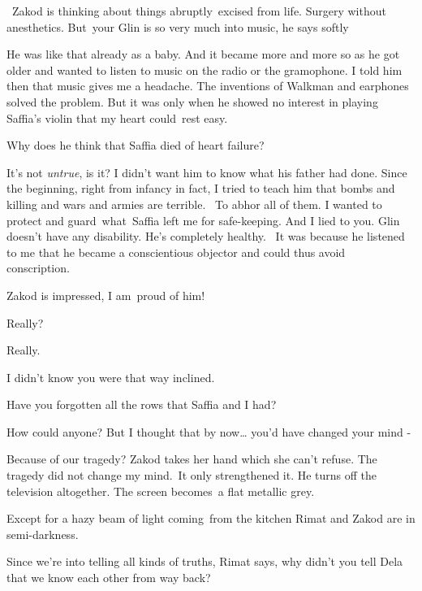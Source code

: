 \documentclass[letterpaper]{article}
\begin{document}
~Zakod is thinking about things abruptly~excised from life. Surgery without anesthetics. {\textquotedbl}But~your Glin is
so very much into music,{\textquotedbl} he says softly

{\textquotedbl}He was like that already as a baby. And it became more and more so as he got older and wanted to listen
to music on the radio or the gramophone. I told him then that music gives me a headache. The inventions of Walkman and
earphones solved the problem. But it was only when he showed no interest in playing Saffia's violin that my heart
could\ rest easy.{\textquotedbl} 

{\textquotedbl}Why does he think that Saffia died of heart failure?{\textquotedbl} ~

{\textquotedbl}It's not\textit{ untrue}, is it? I didn't want him to know what his father had done. Since the beginning,
right from infancy in fact, I tried to teach him that bombs and killing and wars and armies are terrible.~ To abhor all
of them. I wanted to protect and guard~what~Saffia left me for safe-keeping. And I lied to you. Glin doesn't have any
disability. He's completely healthy. ~It was because he listened to me that he became a conscientious objector and
could thus avoid conscription.{\textquotedbl}\textcolor{red}{\ }

Zakod is impressed, {\textquotedbl}I am\ proud of him!{\textquotedbl} 

{\textquotedbl}Really?{\textquotedbl} 

{\textquotedbl}Really.{\textquotedbl}~ 

{\textquotedbl}I didn't know you were that way inclined.{\textquotedbl} 

{\textquotedbl}Have you forgotten all the rows that Saffia and I had?{\textquotedbl} 

{\textquotedbl}How could anyone?  But I thought that by now{\dots} you'd have changed your mind -{\textquotedbl}

{\textquotedbl}Because of our tragedy?{\textquotedbl} Zakod takes her hand which she can't refuse. {\textquotedbl}The
tragedy did not change my mind.\ It only strengthened it.{\textquotedbl} He turns off the television altogether. The
screen becomes~a flat metallic grey.

Except for a hazy beam of light coming\textcolor[rgb]{0.8901961,0.42352942,0.039215688}{\ }from the kitchen Rimat and
Zakod are in semi-darkness. 

{\textquotedbl}Since we're into telling all kinds of truths,{\textquotedbl} Rimat says, {\textquotedbl}why didn't you
tell Dela that we know each other from way back?{\textquotedbl} 
\end{document}
